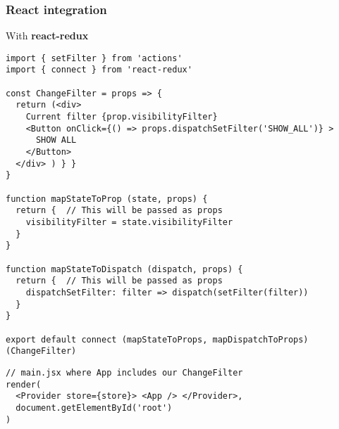 \begin{frame}[fragile]
  \frametitle{React integration}
  \begin{multicols}{2}
  \footnotesize With \textbf{react-redux}
  \begin{verbatim}
import { setFilter } from 'actions'
import { connect } from 'react-redux'

const ChangeFilter = props => {
  return (<div>
    Current filter {prop.visibilityFilter}
    <Button onClick={() => props.dispatchSetFilter('SHOW_ALL')} >
      SHOW ALL
    </Button>
  </div> ) } }
}

function mapStateToProp (state, props) {
  return {  // This will be passed as props
    visibilityFilter = state.visibilityFilter  
  }
}

function mapStateToDispatch (dispatch, props) {
  return {  // This will be passed as props
    dispatchSetFilter: filter => dispatch(setFilter(filter))
  }
}

export default connect (mapStateToProps, mapDispatchToProps)(ChangeFilter)
  \end{verbatim}
  \columnbreak
  \begin{verbatim}
// main.jsx where App includes our ChangeFilter
render( 
  <Provider store={store}> <App /> </Provider>,
  document.getElementById('root')
)
  \end{verbatim}
  \end{multicols}
\end{frame}
